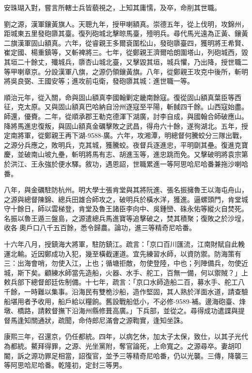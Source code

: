 \begin{pinyinscope}
安珠瑚入對，嘗言所轄士兵皆藐視之，上知其庸懦，及卒，命削其世職。

劉之源，漢軍鑲黃旗人。天聰九年，授甲喇額真。崇德五年，從上伐明，攻錦州，距城東五里發砲隳其臺。復列砲城北擊晾馬臺，殪明兵。尋代馬光遠為正黃、鑲黃二旗漢軍固山額真。六年，從睿親王多爾袞圍松山，發砲隳臺四，獲明將王希賢、崔定國、楊重鎮等，又斬裨將三。七年，從鄭親王濟爾哈朗圍塔山，列砲城西，毀其垣二十餘丈，殲城兵，隳杏山城北臺，又擊毀其垣，城兵懼，乃出降，授世職二等甲喇章京。分設漢軍八旗，之源仍領鑲黃旗。八年，從鄭親王攻克中後所，斬明將吳良弼、王國安等；進攻前屯衛，發砲隳其城：進世職一等。

順治元年，從入關，命與固山額真李國翰剿定畿南餘寇。復從固山額真葉臣等西征，克太原。又與固山額真巴哈納自汾州逐寇至平陽，斬馘四千餘。山西寇始盡。師還，優賚。二年，從順承郡王勒克德渾下湖廣，討李自成，與國翰合師破應山。降將馬進忠復叛，與固山額真金礪擊敗之武昌，得舟六十餘，遂徇湖北。五年，授定南將軍，從鄭親王再下湖-9588-廣。六年，攻湘潭，明總督何騰蛟分三隊出戰，之源分兵應之，敗明兵，克其城，獲騰蛟。夜督兵逐進忠，平明劘其壘。復進克寶慶，並破南山坡九壘，斬明將馬有志、胡進玉等，進忠跳而免。又擊破明將袁宗第於洪江、王永強於便水驛。敘功，遇恩詔，世職累進一等阿思哈尼哈番兼拖沙喇哈番。

八年，與金礪駐防杭州。明大學士張肯堂與其將阮進、張名振擁魯王以海屯舟山，之源與總督陳錦、總兵田雄合師攻之，破明兵於橫水洋，獲進。逼螺頭門，肯堂城守十餘日，師以雲梯登，肯堂及魯王諸臣李向中、吳鍾巒、硃永佑等縱火自焚死。名振以魯王遁三盤島，之源遣總兵馬進寶等追擊破之，焚其積聚；復敗之於沙埕，收各奧戶口八千五百餘，悉令歸農。論功，進三等精奇尼哈番。

十六年八月，授鎮海大將軍，駐防鎮江。疏言：「京口百川匯流，江南財賦自此輓運北輸。近因鄭成功入犯，幾至橫截運道。宜先練習水師，以資防禦。防海策有三：出海會哨，勿使入江，上也；循塘拒敵，勿使登陸，中也；列陣備兵，勿使近城，斯下矣。顧練水師當先造船，火器、水手、舵工，百無一備，何以禦賊？」上敕兵部下總督郎廷佐制備。十七年，疏言：「京口水師造船二百，募水手、舵工八千餘，一時難以集事。沿海民有雙桅沙船，造作堅固，其人熟於洋面水道，請查驗船堪用者予收用，船戶給以糧餉。舊設戰船低小，不必修-9589-補。邊海砲臺、烽墩、橋路，請敕督撫下沿海州縣修葺高廣。」下兵部，並從之。尋得成功遣諜與提督馬逢知關通狀，疏聞，命侍郎尼滿會之源鞫實，逢知坐誅。

康熙三年，召還京，仍任都統。四年，以病乞休，加太子太保，致仕，以其子光代為都統。鰲拜得罪，之源、光坐黨附，奪官論死，上命寬之。之源尋卒。妻胡叩閽，訴之源功罪足相當，詔復官，並予三等精奇尼哈番，仍以光襲。三傳，降襲三等阿思哈尼哈番。乾隆初，定封三等男。


\end{pinyinscope}
